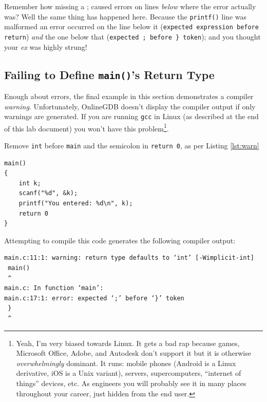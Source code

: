 \documentclass{lab}
\begin{document}
Remember how missing a ; caused errors on lines \textit{below} where the error actually was? Well the same thing has happened here. Because the \texttt{printf()} line was malformed an error occurred on the line below it (\texttt{expected expression before return}) \textit{and} the one below that (\texttt{expected ; before \} token}); and you thought your \textit{ex} was highly strung!

\pagebreak

\subsection{Failing to Define \texttt{main()}'s Return Type}

Enough about errors, the final example in this section demonstrates a compiler \textit{warning}. Unfortunately, OnlineGDB doesn't display the compiler output if only warnings are generated. If you are running \texttt{gcc} in Linux (as described at the end of this lab document) you won't have this problem\footnote{Yeah, I'm very biased towards Linux. It gets a bad rap because games, Microsoft Office, Adobe, and Autodesk don't support it but it is otherwise \textit{overwhelmingly} dominant. It runs: mobile phones (Android is a Linux derivative, iOS is a Unix variant), servers, supercomputers, ``internet of things'' devices, etc. As engineers you will probably see it in many places throughout your career, just hidden from the end user.}.

\begin{task}{}{} Remove \texttt{int} before \texttt{main} and the semicolon in \texttt{return 0}, as per Listing \ref{lst:warn}

\begin{lstlisting}[style=CStyle,caption=Example code which generates a warning.,label=lst:warn]
main()
{
    int k;
    scanf("%d", &k);
    printf("You entered: %d\n", k);
    return 0
}
\end{lstlisting}
\end{task}

Attempting to compile this code generates the following compiler output:

\begin{lstlisting}[basicstyle=\ttfamily,frame=single,caption=Compiler output produced when \texttt{main()} return type is omitted.,captionpos=b]
main.c:11:1: warning: return type defaults to ‘int’ [-Wimplicit-int]
 main()
 ^
main.c: In function ‘main’:
main.c:17:1: error: expected ‘;’ before ‘}’ token
 }
 ^
\end{lstlisting}
\end{document}
